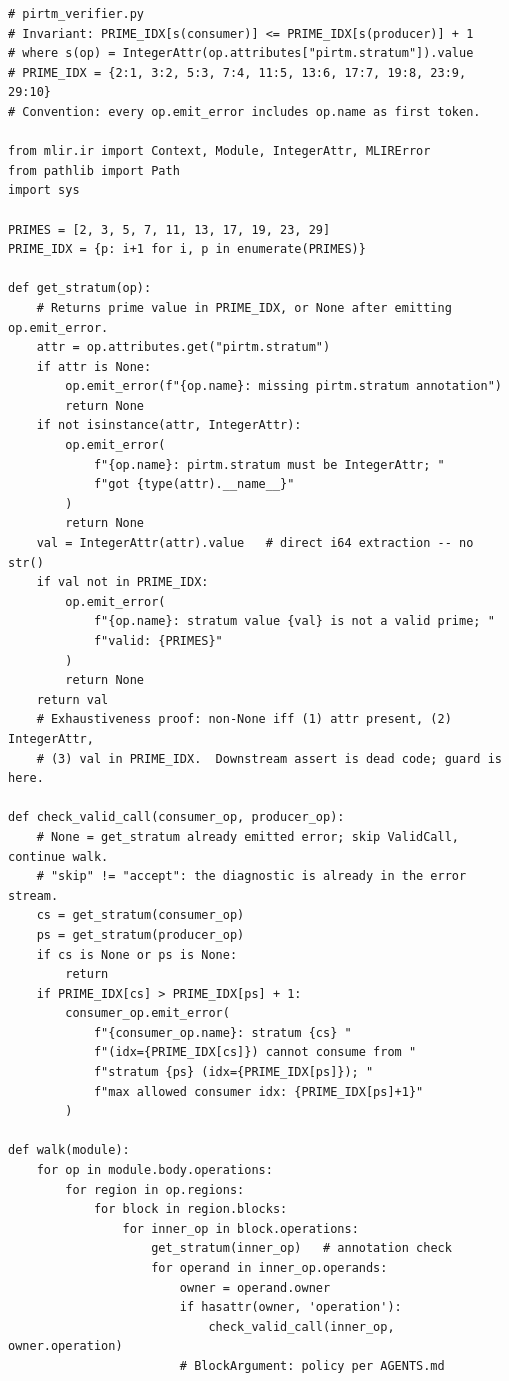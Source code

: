 \documentclass[11pt,letterpaper]{article}
\theoremstyle{pirtmthm}
\theoremstyle{remark}
\begin{document}
\begin{lstlisting}[style=python,
  caption={pirtm\_verifier.py --- Verifier with get\_stratum, check\_valid\_call, walk, and entrypoint}]
# pirtm_verifier.py
# Invariant: PRIME_IDX[s(consumer)] <= PRIME_IDX[s(producer)] + 1
# where s(op) = IntegerAttr(op.attributes["pirtm.stratum"]).value
# PRIME_IDX = {2:1, 3:2, 5:3, 7:4, 11:5, 13:6, 17:7, 19:8, 23:9, 29:10}
# Convention: every op.emit_error includes op.name as first token.

from mlir.ir import Context, Module, IntegerAttr, MLIRError
from pathlib import Path
import sys

PRIMES = [2, 3, 5, 7, 11, 13, 17, 19, 23, 29]
PRIME_IDX = {p: i+1 for i, p in enumerate(PRIMES)}

def get_stratum(op):
    # Returns prime value in PRIME_IDX, or None after emitting op.emit_error.
    attr = op.attributes.get("pirtm.stratum")
    if attr is None:
        op.emit_error(f"{op.name}: missing pirtm.stratum annotation")
        return None
    if not isinstance(attr, IntegerAttr):
        op.emit_error(
            f"{op.name}: pirtm.stratum must be IntegerAttr; "
            f"got {type(attr).__name__}"
        )
        return None
    val = IntegerAttr(attr).value   # direct i64 extraction -- no str()
    if val not in PRIME_IDX:
        op.emit_error(
            f"{op.name}: stratum value {val} is not a valid prime; "
            f"valid: {PRIMES}"
        )
        return None
    return val
    # Exhaustiveness proof: non-None iff (1) attr present, (2) IntegerAttr,
    # (3) val in PRIME_IDX.  Downstream assert is dead code; guard is here.

def check_valid_call(consumer_op, producer_op):
    # None = get_stratum already emitted error; skip ValidCall, continue walk.
    # "skip" != "accept": the diagnostic is already in the error stream.
    cs = get_stratum(consumer_op)
    ps = get_stratum(producer_op)
    if cs is None or ps is None:
        return
    if PRIME_IDX[cs] > PRIME_IDX[ps] + 1:
        consumer_op.emit_error(
            f"{consumer_op.name}: stratum {cs} "
            f"(idx={PRIME_IDX[cs]}) cannot consume from "
            f"stratum {ps} (idx={PRIME_IDX[ps]}); "
            f"max allowed consumer idx: {PRIME_IDX[ps]+1}"
        )

def walk(module):
    for op in module.body.operations:
        for region in op.regions:
            for block in region.blocks:
                for inner_op in block.operations:
                    get_stratum(inner_op)   # annotation check
                    for operand in inner_op.operands:
                        owner = operand.owner
                        if hasattr(owner, 'operation'):
                            check_valid_call(inner_op, owner.operation)
                        # BlockArgument: policy per AGENTS.md


\end{lstlisting}
\end{document}
